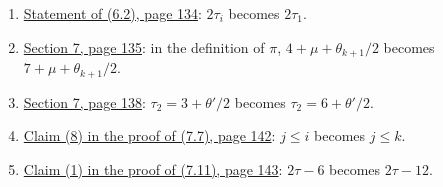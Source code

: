 \begin{enumerate}
$Z_2$.
\item {}\hyperref[fix:6.2]{Statement of (6.2), page 134}: $2\tau_i$ becomes $2\tau_1$.
\item {}\hyperref[fix:7-pi]{Section 7, page 135}: in the definition of $\pi$,
$4 + \mu + \theta_{k+1}/2$ becomes $7 + \mu + \theta_{k+1}/2$.
\item {}\hyperref[fix:7-tau2]{Section 7, page 138}: $\tau_2 = 3 + \theta'/2$ becomes
$\tau_2 = 6 + \theta'/2$.
\item {}\hyperref[fix:7.7-claim8]{Claim (8) in the proof of (7.7), page 142}: $j \le i$ becomes
$j \le k$.
\item {}\hyperref[fix:7.11-claim1]{Claim (1) in the proof of (7.11), page 143}: $2\tau - 6$
becomes $2\tau - 12$.
\end{enumerate}
